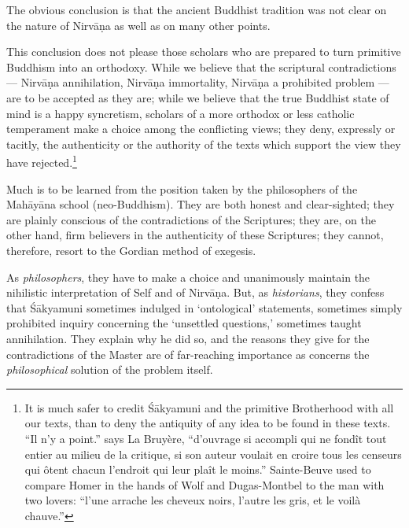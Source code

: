 \documentclass[a4paper, 11pt, oneside, english, landscape]{article}
\begin{document}
The obvious conclusion is that the ancient Buddhist tradition was not clear on the nature of Nirvāṇa as well as on many other points.

This conclusion does not please those scholars who are prepared to turn primitive Buddhism into an orthodoxy. While we believe that the scriptural contradictions --- Nirvāṇa annihilation, Nirvāṇa immortality, Nirvāṇa a prohibited problem --- are to be accepted as they are; while we believe that the true Buddhist state of mind is a happy syncretism, scholars of a more orthodox or less catholic temperament make a choice among the conflicting views; they deny, expressly or tacitly, the authenticity or the authority of the texts which support the view they have rejected.\footnote{It is much safer to credit Śākyamuni and the primitive Brotherhood with all our texts, than to deny the antiquity of any idea to be found in these texts. ``Il n'y a point.'' says La Bruyère, ``d'ouvrage si accompli qui ne fondît tout entier au milieu de la critique, si son auteur voulait en croire tous les censeurs qui ôtent chacun l'endroit qui leur plaît le moins.'' Sainte-Beuve used to compare Homer in the hands of Wolf and Dugas-Montbel to the man with two lovers: ``l'une arrache les cheveux noirs, l'autre les gris, et le voilà chauve.''}

Much is to be learned from the position taken by the philosophers of the Mahāyāna school (neo-Buddhism). They are both honest and clear-sighted; they are plainly conscious of the contradictions of the Scriptures; they are, on the other hand, firm believers in the authenticity of these Scriptures; they cannot, therefore, resort to the Gordian method of exegesis.

As \emph{philosophers}, they have to make a choice and unanimously maintain the nihilistic interpretation of Self and of Nirvāṇa. But, as \emph{historians}, they confess that Śākyamuni sometimes indulged in `ontological' statements, sometimes simply prohibited inquiry concerning the `unsettled questions,' sometimes taught annihilation. They explain why he did so, and the reasons they give for the contradictions of the Master are of far-reaching importance as concerns the \emph{philosophical} solution of the problem itself.
\end{document}
